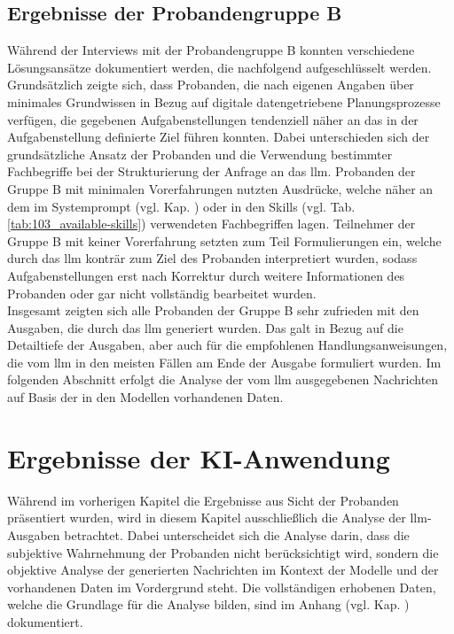 \subsection{Ergebnisse der Probandengruppe B} 
\label{sec:results-group-b}

Während der Interviews mit der Probandengruppe B konnten verschiedene Lösungsansätze dokumentiert werden, die nachfolgend aufgeschlüsselt werden. \\

Grundsätzlich zeigte sich, dass Probanden, die nach eigenen Angaben über minimales Grundwissen in Bezug auf digitale datengetriebene Planungsprozesse verfügen,
die gegebenen Aufgabenstellungen tendenziell näher an das in der Aufgabenstellung definierte Ziel führen konnten.
Dabei unterschieden sich der grundsätzliche Ansatz der Probanden und die Verwendung bestimmter Fachbegriffe bei der Strukturierung der Anfrage an das \gls{llm}.
Probanden der Gruppe B mit minimalen Vorerfahrungen nutzten Ausdrücke, welche näher an dem im Systemprompt (vgl. Kap. ) 
oder in den Skills (vgl. Tab. \ref{tab:103_available-skills}) verwendeten Fachbegriffen lagen.
Teilnehmer der Gruppe B mit keiner Vorerfahrung setzten zum Teil Formulierungen ein, welche durch das \gls{llm} konträr zum Ziel des Probanden interpretiert wurden, 
sodass Aufgabenstellungen erst nach Korrektur durch weitere Informationen des Probanden oder gar nicht vollständig bearbeitet wurden. \\

Insgesamt zeigten sich alle Probanden der Gruppe B sehr zufrieden mit den Ausgaben, die durch das \gls{llm} generiert wurden.
Das galt in Bezug auf die Detailtiefe der Ausgaben, aber auch für die empfohlenen Handlungsanweisungen, die vom \gls{llm} in den meisten Fällen am Ende der Ausgabe formuliert wurden.
Im folgenden Abschnitt erfolgt die Analyse der vom \gls{llm} ausgegebenen Nachrichten auf Basis der in den Modellen vorhandenen Daten.

\section{Ergebnisse der KI-Anwendung}
\label{sec:results-ai}

Während im vorherigen Kapitel die Ergebnisse aus Sicht der Probanden präsentiert wurden, wird in diesem Kapitel ausschließlich die Analyse der \gls{llm}-Ausgaben betrachtet.
Dabei unterscheidet sich die Analyse darin, dass die subjektive Wahrnehmung der Probanden nicht berücksichtigt wird, sondern die objektive Analyse der generierten Nachrichten im Kontext der Modelle und der vorhandenen Daten im Vordergrund steht.
Die vollständigen erhobenen Daten, welche die Grundlage für die Analyse bilden, sind im Anhang (vgl. Kap. ) dokumentiert. \\

